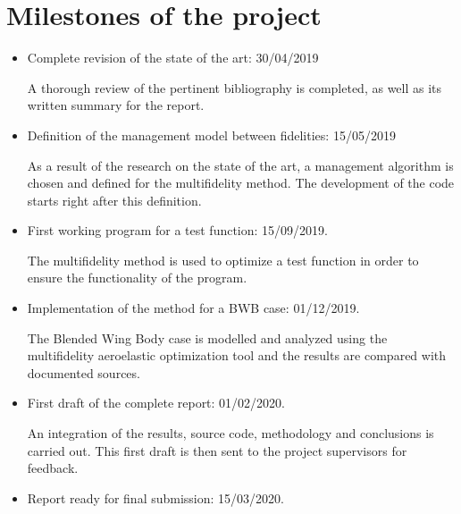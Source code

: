 \section{Milestones of the project}
\label{sec:milestones}
\begin{itemize}
    \item Complete revision of the state of the art: 30/04/2019
    
    A thorough review of the pertinent bibliography is completed, as well as its written summary for the report.
    \item Definition of the management model between fidelities: 15/05/2019
    
    As a result of the research on the state of the art, a management algorithm is chosen and defined for the multifidelity method. The development of the code starts right after this definition.
    \item First working program for a test function: 15/09/2019.
    
    The multifidelity method is used to optimize a test function in order to ensure the functionality of the program. 
    \item Implementation of the method for a BWB case: 01/12/2019.
    
    The Blended Wing Body case is modelled and analyzed using the multifidelity aeroelastic optimization tool and the results are compared with documented sources.
    \item First draft of the complete report: 01/02/2020.
    
    An integration of the results, source code, methodology and conclusions is carried out. This first draft is then sent to the project supervisors for feedback.
    \item Report ready for final submission: 15/03/2020.
\end{itemize}
